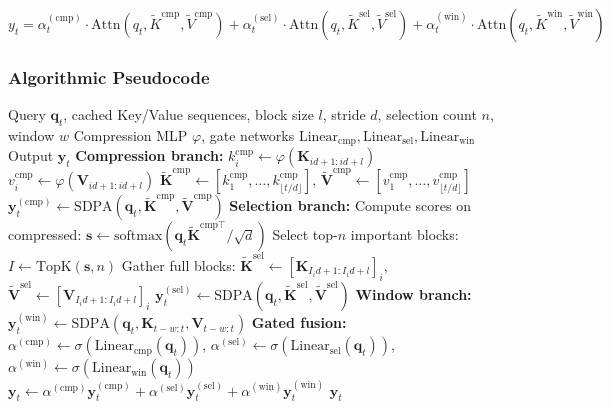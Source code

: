\documentclass[11pt,a4paper]{article}
\begin{document}
\[
y_t = \alpha_t^{(\text{cmp})} \cdot \text{Attn}(q_t, \tilde{K}^{\text{cmp}}, \tilde{V}^{\text{cmp}}) + \alpha_t^{(\text{sel})} \cdot \text{Attn}(q_t, \tilde{K}^{\text{sel}}, \tilde{V}^{\text{sel}}) + \alpha_t^{(\text{win})} \cdot \text{Attn}(q_t, \tilde{K}^{\text{win}}, \tilde{V}^{\text{win}})
\]

\subsubsection{Algorithmic Pseudocode}

\begin{algorithm}[H]
\caption{NSA: Compressed + Selected + Window Branches with Learned Gating}
\begin{algorithmic}[1]
\Require Query $\mathbf{q}_t$, cached Key/Value sequences, block size $l$, stride $d$, selection count $n$, window $w$
\Require Compression MLP $\varphi$, gate networks $\text{Linear}_{\text{cmp}}, \text{Linear}_{\text{sel}}, \text{Linear}_{\text{win}}$
\Ensure Output $\mathbf{y}_t$
\State \textbf{Compression branch:}
    \State $k_i^{\text{cmp}} \gets \varphi(\mathbf{K}_{id+1:id+l})$ 
    \State $v_i^{\text{cmp}} \gets \varphi(\mathbf{V}_{id+1:id+l})$
\EndFor
\State $\tilde{\mathbf{K}}^{\text{cmp}} \gets [k_1^{\text{cmp}}, \ldots, k_{\lfloor t/d \rfloor}^{\text{cmp}}]$, $\tilde{\mathbf{V}}^{\text{cmp}} \gets [v_1^{\text{cmp}}, \ldots, v_{\lfloor t/d \rfloor}^{\text{cmp}}]$
\State $\mathbf{y}_t^{(\text{cmp})} \gets \text{SDPA}(\mathbf{q}_t, \tilde{\mathbf{K}}^{\text{cmp}}, \tilde{\mathbf{V}}^{\text{cmp}})$
\State \textbf{Selection branch:}
\State Compute scores on compressed: $\mathbf{s} \gets \text{softmax}(\mathbf{q}_t \tilde{\mathbf{K}}^{\text{cmp}\top} / \sqrt{d})$
\State Select top-$n$ important blocks: $I \gets \mathrm{TopK}(\mathbf{s}, n)$
\State Gather full blocks: $\tilde{\mathbf{K}}^{\text{sel}} \gets [\mathbf{K}_{I_i d+1:I_i d+l}]_i$, $\tilde{\mathbf{V}}^{\text{sel}} \gets [\mathbf{V}_{I_i d+1:I_i d+l}]_i$
\State $\mathbf{y}_t^{(\text{sel})} \gets \text{SDPA}(\mathbf{q}_t, \tilde{\mathbf{K}}^{\text{sel}}, \tilde{\mathbf{V}}^{\text{sel}})$
\State \textbf{Window branch:}
\State $\mathbf{y}_t^{(\text{win})} \gets \text{SDPA}(\mathbf{q}_t, \mathbf{K}_{t-w:t}, \mathbf{V}_{t-w:t})$
\State \textbf{Gated fusion:}
\State $\alpha^{(\text{cmp})} \gets \sigma(\text{Linear}_{\text{cmp}}(\mathbf{q}_t))$, $\alpha^{(\text{sel})} \gets \sigma(\text{Linear}_{\text{sel}}(\mathbf{q}_t))$, $\alpha^{(\text{win})} \gets \sigma(\text{Linear}_{\text{win}}(\mathbf{q}_t))$
\State $\mathbf{y}_t \gets \alpha^{(\text{cmp})} \mathbf{y}_t^{(\text{cmp})} + \alpha^{(\text{sel})} \mathbf{y}_t^{(\text{sel})} + \alpha^{(\text{win})} \mathbf{y}_t^{(\text{win})}$
\Return $\mathbf{y}_t$
\end{algorithmic}
\end{algorithm}
\end{document}
